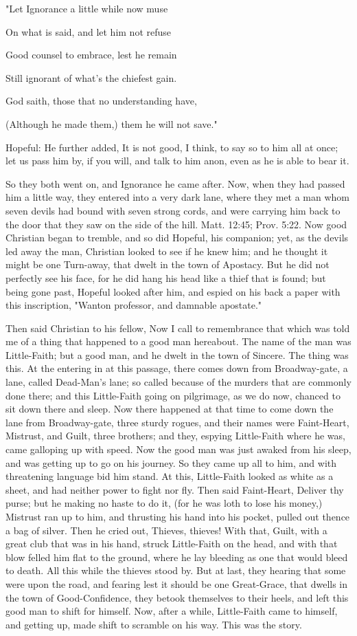 "Let Ignorance a little while now muse

On what is said, and let him not refuse

Good counsel to embrace, lest he remain

Still ignorant of what's the chiefest gain.

God saith, those that no understanding have,

(Although he made them,) them he will not save."

Hopeful: He further added, It is not good, I think, to say so to him
all at once; let us pass him by, if you will, and talk to him anon,
even as he is able to bear it.

So they both went on, and Ignorance he came after. Now, when they had
passed him a little way, they entered into a very dark lane, where they
met a man whom seven devils had bound with seven strong cords, and were
carrying him back to the door that they saw on the side of the hill.
Matt. 12:45; Prov. 5:22. Now good Christian began to tremble, and so
did Hopeful, his companion; yet, as the devils led away the man,
Christian looked to see if he knew him; and he thought it might be one
Turn-away, that dwelt in the town of Apostacy. But he did not perfectly
see his face, for he did hang his head like a thief that is found; but
being gone past, Hopeful looked after him, and espied on his back a
paper with this inscription, "Wanton professor, and damnable apostate."

Then said Christian to his fellow, Now I call to remembrance that which
was told me of a thing that happened to a good man hereabout. The name
of the man was Little-Faith; but a good man, and he dwelt in the town
of Sincere. The thing was this. At the entering in at this passage,
there comes down from Broadway-gate, a lane, called Dead-Man's lane; so
called because of the murders that are commonly done there; and this
Little-Faith going on pilgrimage, as we do now, chanced to sit down
there and sleep. Now there happened at that time to come down the lane
from Broadway-gate, three sturdy rogues, and their names were
Faint-Heart, Mistrust, and Guilt, three brothers; and they, espying
Little-Faith where he was, came galloping up with speed. Now the good
man was just awaked from his sleep, and was getting up to go on his
journey. So they came up all to him, and with threatening language bid
him stand. At this, Little-Faith looked as white as a sheet, and had
neither power to fight nor fly. Then said Faint-Heart, Deliver thy
purse; but he making no haste to do it, (for he was loth to lose his
money,) Mistrust ran up to him, and thrusting his hand into his pocket,
pulled out thence a bag of silver. Then he cried out, Thieves, thieves!
With that, Guilt, with a great club that was in his hand, struck
Little-Faith on the head, and with that blow felled him flat to the
ground, where he lay bleeding as one that would bleed to death. All
this while the thieves stood by. But at last, they hearing that some
were upon the road, and fearing lest it should be one Great-Grace, that
dwells in the town of Good-Confidence, they betook themselves to their
heels, and left this good man to shift for himself. Now, after a while,
Little-Faith came to himself, and getting up, made shift to scramble on
his way. This was the story.


